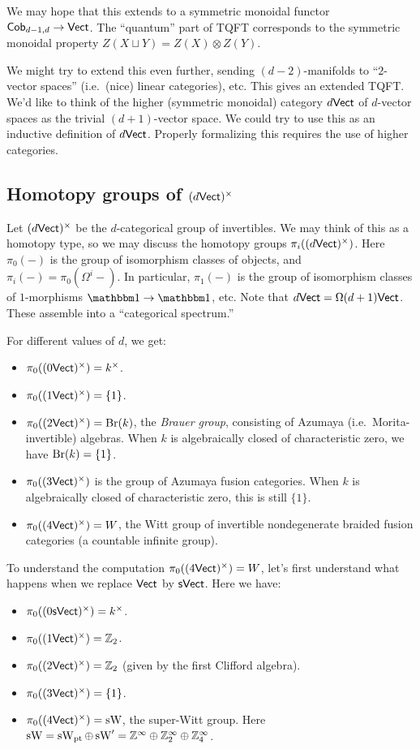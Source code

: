 \documentclass{amsart}
\begin{document}
We may hope that this extends to a symmetric monoidal functor $\mathsf{Cob}_{d-1,d} \to \mathsf{Vect}$.
The ``quantum'' part of TQFT corresponds to the symmetric monoidal property $Z(X \sqcup Y) = Z(X) \otimes Z(Y)$.

We might try to extend this even further, sending $(d-2)$-manifolds to ``$2$-vector spaces'' (i.e.\ (nice) linear categories), etc.
This gives an extended TQFT.
We'd like to think of the higher (symmetric monoidal) category $d\mathsf{Vect}$ of $d$-vector spaces as the trivial $(d+1)$-vector space.
We could try to use this as an inductive definition of $d\mathsf{Vect}$.
Properly formalizing this requires the use of higher categories.

\subsection{Homotopy groups of $(d\mathsf{Vect})^\times$}

Let $(d\mathsf{Vect})^\times$ be the $d$-categorical group of invertibles. 
We may think of this as a homotopy type, so we may discuss the homotopy groups $\pi_i((d\mathsf{Vect})^\times)$.
Here $\pi_0(-)$ is the group of isomorphism classes of objects, and $\pi_i(-) = \pi_0(\Omega^i - )$.
In particular, $\pi_1(-)$ is the group of isomorphism classes of $1$-morphisms $\onebb \to \onebb$, etc.
Note that $d\mathsf{Vect} = \Omega (d+1)\mathsf{Vect}$.
These assemble into a ``categorical spectrum.''

For different values of $d$, we get:
\begin{itemize}
  \item $\pi_0((0\mathsf{Vect})^\times) = k^\times$.
  \item $\pi_0((1\mathsf{Vect})^\times) = \{ 1 \}$.
  \item $\pi_0((2\mathsf{Vect})^\times) = \operatorname{Br}(k)$, the \emph{Brauer group}, consisting of Azumaya (i.e.\ Morita-invertible) algebras.
    When $k$ is algebraically closed of characteristic zero, we have $\operatorname{Br}(k) = \{ 1 \}$.
  \item $\pi_0((3\mathsf{Vect})^\times)$ is the group of Azumaya fusion categories.
    When $k$ is algebraically closed of characteristic zero, this is still $\{ 1 \}$.
  \item $\pi_0((4\mathsf{Vect})^\times) = W$, the Witt group of invertible nondegenerate braided fusion categories (a countable infinite group).
\end{itemize}

To understand the computation $\pi_0((4\mathsf{Vect})^\times) = W$, let's first understand what happens when we replace $\mathsf{Vect}$ by $\mathsf{sVect}$.
Here we have:
\begin{itemize}
  \item $\pi_0((0\mathsf{sVect})^\times) = k^\times$.
  \item $\pi_0((1\mathsf{Vect})^\times) = \mathbb{Z}_2$.
  \item $\pi_0((2\mathsf{Vect})^\times) = \mathbb{Z}_2$ (given by the first Clifford algebra).
  \item $\pi_0((3\mathsf{Vect})^\times) = \{ 1 \}$.
  \item $\pi_0((4\mathsf{Vect})^\times) = \operatorname{sW}$, the super-Witt group.
    Here $\operatorname{sW} = \operatorname{sW}_{\mathrm{pt}} \oplus \operatorname{sW}' = \mathbb{Z}^\infty \oplus \mathbb{Z}_2^\infty \oplus \mathbb{Z}_4^\infty$.
\end{itemize}
\end{document}

